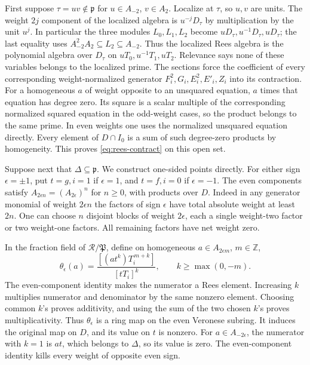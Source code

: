 First suppose \(\tau=uv\notin\mathfrak p\) for \(u\in A_{-2}\),
\(v\in A_2\). Localize at \(\tau\), so \(u,v\) are units. The
weight \(2j\) component of the localized algebra is \(u^{-j}D_\tau\)
by multiplication by the unit \(u^j\). In particular the three
modules \(L_0,L_1,L_2\) become \(uD_\tau,u^{-1}D_\tau,uD_\tau\);
the last equality uses \(A_{-2}^2 A_2\subseteq L_2\subseteq A_{-2}\).
Thus the localized Rees algebra is the polynomial algebra over
\(D_\tau\) on \(uT_0,u^{-1}T_1,uT_2\). Relevance says none of
these variables belongs to the localized prime. The sections force
the coefficient of every corresponding weight-normalized generator
\(F_i^2,G_i,E_i^2,E'_i,Z_i\) into its contraction. For a homogeneous
\(a\) of weight opposite to an unsquared equation, \(a\) times that
equation has degree zero. Its square is a scalar multiple of the
corresponding normalized squared equation in the odd-weight cases,
so the product belongs to the same prime. In even weights one uses
the normalized unsquared equation directly. Every element of
\(D\cap I_0\) is a sum of such degree-zero products by homogeneity.
This proves \eqref{eq:rees-contract} on this open set.

Suppose next that \(\Delta\subseteq\mathfrak p\). We construct
one-sided points directly. For either sign \(\epsilon=\pm1\), put
\(t=g,i=1\) if \(\epsilon=1\), and \(t=f,i=0\) if \(\epsilon=-1\).
The even components satisfy
\(A_{2\epsilon n}=(A_{2\epsilon})^n\) for \(n\ge0\), with products
over \(D\). Indeed in any generator monomial of weight \(2\epsilon n\)
the factors of sign \(\epsilon\) have total absolute weight at least
\(2n\). One can choose \(n\) disjoint blocks of weight \(2\epsilon\),
each a single weight-two factor or two weight-one factors. All
remaining factors have net weight zero.

In the fraction field of \(\mathcal R/\mathfrak P\), define on
homogeneous \(a\in A_{2\epsilon m}\), \(m\in\mathbb Z\),
\[
 \theta_\epsilon(a)=
       \frac{[(at^k)T_i^{\,m+k}]}{[tT_i]^k},
             \qquad k\ge\max(0,-m).
\]
The even-component identity makes the numerator a Rees element.
Increasing \(k\) multiplies numerator and denominator by the same
nonzero element. Choosing common \(k\)'s proves additivity, and
using the sum of the two chosen \(k\)'s proves multiplicativity.
Thus \(\theta_\epsilon\) is a ring map on the even Veronese subring.
It induces the original map on \(D\), and its value on \(t\) is
nonzero. For \(a\in A_{-2\epsilon}\), the numerator with \(k=1\)
is \(at\), which belongs to \(\Delta\), so its value is zero.
The even-component identity kills every weight of opposite even sign.

